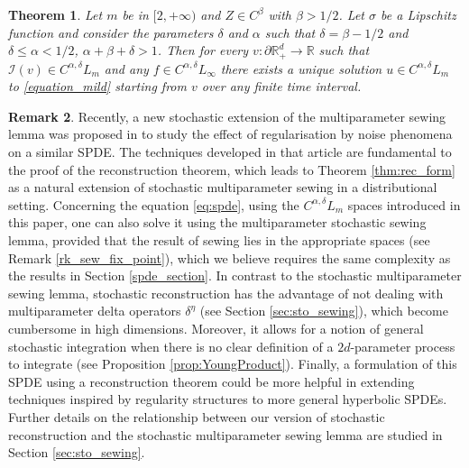 \documentclass[12pt]{article}
\numberwithin{equation}{section}
\theoremstyle{plain}
\newtheorem{theorem}{Theorem}[section]
\theoremstyle{definition}
\newtheorem{remark}[theorem]{Remark}
\begin{document}
\begin{theorem}
Let $m$ be in $[2,+\infty)$ and $ Z\in  C^{\beta}$ with $\beta >1/2$. Let $\sigma$ be a Lipschitz function and consider the parameters $\delta$ and $\alpha$ such that $\delta= \beta- 1/2$ and $\delta\leq \alpha< 1/2$,  $\alpha+\beta+ \delta>1$. Then for 
every $v\colon \partial \mathbb R_+^d\to \mathbb R$ such that  $\mathcal{I}(v)\in C^{\alpha, \delta}L_m$ and any $f\in  C^{\alpha, \delta}L_{\infty}$ there exists a unique solution $u\in  C^{\alpha, \delta}L_m$ to \eqref{equation_mild} starting
from $v$ over any finite time interval.
\end{theorem}
\begin{remark}
Recently, a new stochastic extension of the multiparameter sewing lemma was proposed in \cite{multiparameterStochSewing} to study the effect of regularisation by noise phenomena on a similar SPDE. The techniques developed in that article are fundamental to the proof of the reconstruction theorem, which leads to Theorem \ref{thm:rec_form} as a natural extension of stochastic multiparameter sewing in a distributional setting. Concerning the equation \eqref{eq:spde}, using the $C^{\alpha, \delta}L_{m}$ spaces introduced in this paper, one can also solve it using the multiparameter stochastic sewing lemma, provided that the result of sewing lies in the appropriate spaces (see Remark \ref{rk_sew_fix_point}), which we believe requires the same complexity as the results in Section \ref{spde_section}. 
In contrast to the stochastic multiparameter sewing lemma, stochastic reconstruction has the advantage of not dealing with multiparameter delta operators $\delta^{\eta}$ (see Section \ref{sec:sto_sewing}), which become cumbersome in high dimensions. Moreover, it allows for a notion of general stochastic integration when there is no clear definition of a $2d$-parameter process to integrate (see Proposition \ref{prop:YoungProduct}). Finally, a formulation of this SPDE using a reconstruction theorem could be more helpful in extending techniques inspired by regularity structures to more general hyperbolic SPDEs. Further details on the relationship between our version of stochastic reconstruction and the stochastic multiparameter sewing lemma are studied in Section \ref{sec:sto_sewing}.
\end{remark}
\end{document}
